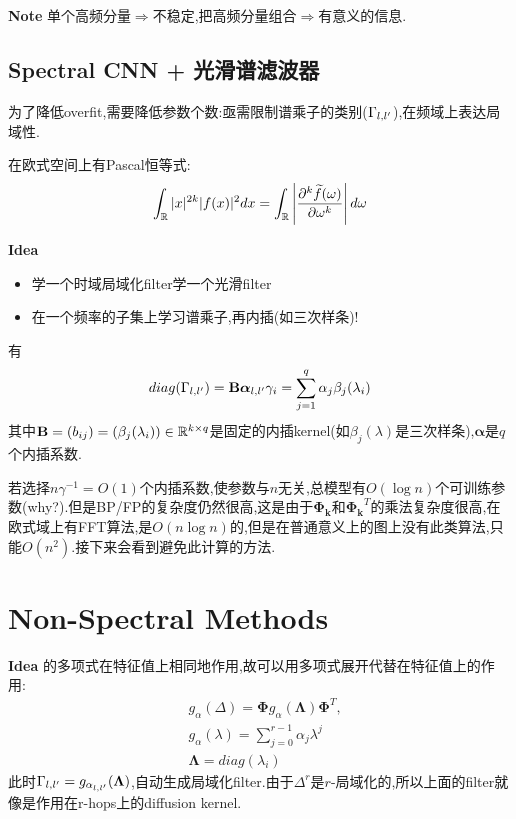 \documentclass{article}
\begin{document}
\textbf{Note} 单个高频分量$\Rightarrow$不稳定,把高频分量组合$\Rightarrow$有意义的信息.

\subsection{Spectral CNN + 光滑谱滤波器}
为了降低overfit,需要降低参数个数:亟需限制谱乘子的类别($\Gamma_{l,l'}$),在频域上表达局域性.

在欧式空间上有Pascal恒等式:
\begin{align}
    \int_{\mathbb{R}}|x|^{2k}|f(x)|^2dx=\int_{\mathbb{R}}\left|\frac{\partial^k \widetilde{f}(\omega)}{\partial\omega^k}\right|d\omega
\end{align}

\textbf{Idea} \begin{itemize}
    \item 学一个时域局域化filter\tRarr 学一个光滑filter
    \item 在一个频率的子集上学习谱乘子,再内插(如三次样条)!
\end{itemize} 

有
\begin{align}
    diag(\Gamma_{l,l'})=\mathbf{B}\boldsymbol{\alpha}_{l,l'}
    \gamma_i=\sum_{j=1}^q \alpha_j \beta_j(\lambda_i)
\end{align}
其中$\mathbf{B}=(b_{ij})=(\beta_j(\lambda_i))\in \mathbb{R}^{k\times q}$是固定的内插kernel(如$\beta_j(\lambda)$是三次样条),$\boldsymbol{\alpha}$是$q$个内插系数.

若选择$n\gamma^{-1}=O(1)$个内插系数,使参数与$n$无关,总模型有$O(\log n)$个可训练参数(why?).但是BP/FP的复杂度仍然很高,这是由于$\boldsymbol{\Phi_k}$和$\boldsymbol{\Phi_k}^T$的乘法复杂度很高,在欧式域上有FFT算法,是$O(n\log n)$的,但是在普通意义上的图上没有此类算法,只能$O(n^2)$.\tRarr 接下来会看到避免此计算的方法.

\section{Non-Spectral Methods}

\textbf{Idea} \lop 的多项式在特征值上相同地作用,故可以用多项式展开代替在特征值上的作用:
\begin{align}
    &g_\alpha(\Delta)=\boldsymbol{\Phi}g_\alpha (\boldsymbol{\Lambda})\boldsymbol{\Phi}^T,\\
    &g_\alpha(\lambda)=\sum_{j=0}^{r-1}\alpha_j \lambda^j\\
    &\boldsymbol{\Lambda}=diag(\lambda_i)
\end{align}
此时$\Gamma_{l,l'}=g_{\alpha_{l,l'}}(\boldsymbol{\Lambda})$,自动生成局域化filter.由于$\Delta^r$是$r$-局域化的,所以上面的filter就像是作用在r-hops上的diffusion kernel.
\end{document}
